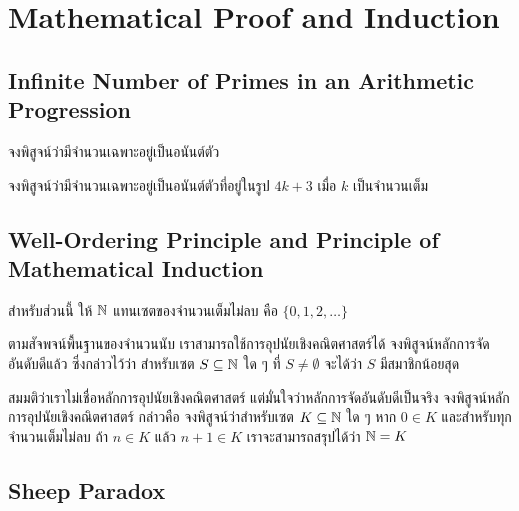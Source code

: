 \chapter{Mathematical Proof and Induction}

\section{Infinite Number of Primes in an Arithmetic Progression}

\begin{exercise}
จงพิสูจน์ว่ามีจำนวนเฉพาะอยู่เป็นอนันต์ตัว
\end{exercise}

\begin{exercise}
จงพิสูจน์ว่ามีจำนวนเฉพาะอยู่เป็นอนันต์ตัวที่อยู่ในรูป $4k+3$ เมื่อ $k$ เป็นจำนวนเต็ม
\end{exercise}

\section{Well-Ordering Principle and Principle of Mathematical Induction}

สำหรับส่วนนี้ ให้ $\mathbb{N}$ แทนเซตของจำนวนเต็มไม่ลบ คือ $\{0, 1, 2, \dots\}$

\begin{exercise}
ตามสัจพจน์พื้นฐานของจำนวนนับ เราสามารถใช้การอุปนัยเชิงคณิตศาสตร์ได้ จงพิสูจน์หลักการจัดอันดับดีแล้ว ซึ่งกล่าวไว้ว่า สำหรับเซต $S \subseteq \mathbb{N}$ ใด ๆ ที่ $S \ne \emptyset$ จะได้ว่า $S$ มีสมาชิกน้อยสุด
\end{exercise}

\begin{exercise}
สมมติว่าเราไม่เชื่อหลักการอุปนัยเชิงคณิตศาสตร์ แต่มั่นใจว่าหลักการจัดอันดับดีเป็นจริง จงพิสูจน์หลักการอุปนัยเชิงคณิตศาสตร์ กล่าวคือ จงพิสูจน์ว่าสำหรับเซต $K \subseteq \mathbb{N}$ ใด ๆ หาก $0 \in K$ และสำหรับทุกจำนวนเต็มไม่ลบ ถ้า $n \in K$ แล้ว $n+1 \in K$ เราจะสามารถสรุปได้ว่า $\mathbb{N} = K$
\end{exercise}

\section{Sheep Paradox}

